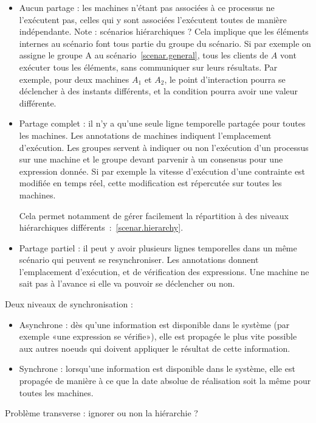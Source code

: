 \documentclass{article}
\newcommand\trigger{point d'interaction\xspace}
\begin{document}
\begin{itemize}
    \item Aucun partage : les machines n'étant pas associées à ce processus ne l'exécutent pas, celles qui y sont associées l'exécutent toutes de manière indépendante. Note : scénarios hiérarchiques ? Cela implique que les éléments internes au scénario font tous partie du groupe du scénario.
    Si par exemple on assigne le groupe A  au scénario~\ref{scenar.general}, tous les clients de $A$ vont exécuter tous les éléments, sans communiquer sur leurs résultats. Par exemple, pour deux machines $A_1$ et $A_2$, le \trigger pourra se déclencher à des instants différents, et la condition pourra avoir une valeur différente.
    \item Partage complet : il n'y a qu'une seule ligne temporelle partagée pour toutes les machines. Les annotations de machines indiquent l'emplacement d'exécution. Les groupes servent à indiquer ou non l'exécution d'un processus sur une machine et le groupe devant parvenir à un consensus pour une expression donnée. Si par exemple la vitesse d'exécution d'une contrainte est modifiée en temps réel, cette modification est répercutée sur toutes les machines.
    
    Cela permet notamment de gérer facilement la répartition à des niveaux hiérarchiques différents~:~\ref{scenar.hierarchy}. 
    \item Partage partiel : il peut y avoir plusieurs lignes temporelles dans un même scénario qui peuvent se resynchroniser. Les annotations donnent l'emplacement d'exécution, et de vérification des expressions. Une machine ne sait pas à l'avance si elle va pouvoir se déclencher ou non. 
    
\end{itemize}

Deux niveaux de synchronisation : 
\begin{itemize}
    \item Asynchrone : dès qu'une information est disponible dans le système (par exemple «une expression se vérifie»), elle est propagée le plus vite possible aux autres noeuds qui doivent appliquer le résultat de cette information.
    \item Synchrone : lorsqu'une information est disponible dans le système, elle est propagée de manière à ce que la date absolue de réalisation soit la même pour toutes les machines.
\end{itemize}

Problème transverse : ignorer ou non la hiérarchie ? 
\end{document}
